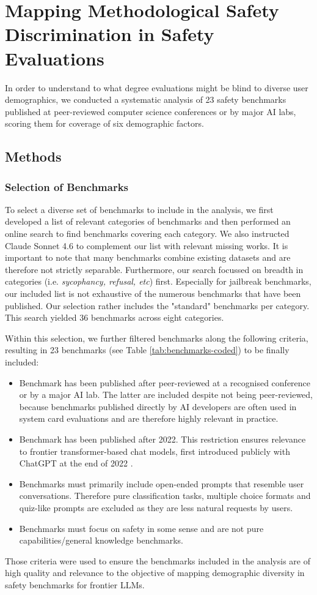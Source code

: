 \chapter{Mapping Methodological Safety Discrimination in Safety Evaluations}
\label{chap:evaleval}
In order to understand to what degree evaluations might be blind to diverse user demographics, we conducted a systematic analysis of 23 safety benchmarks published at peer-reviewed computer science conferences or by major AI labs, scoring them for coverage of six demographic factors. 

\section{Methods}
\subsection{Selection of Benchmarks}
To select a diverse set of benchmarks to include in the analysis, we first developed a list of relevant categories of benchmarks and then performed an online search to find benchmarks covering each category. We also instructed Claude Sonnet 4.6 to complement our list with relevant missing works. It is important to note that many benchmarks combine existing datasets and are therefore not strictly separable. Furthermore, our search focussed on breadth in categories (i.e. \textit{sycophancy, refusal, etc}) first. Especially for jailbreak benchmarks, our included list is not exhaustive of the numerous benchmarks that have been published. Our selection rather includes the "standard" benchmarks per category. This search yielded 36 benchmarks across eight categories. 

Within this selection, we further filtered benchmarks along the following criteria, resulting in 23 benchmarks (see Table \ref{tab:benchmarks-coded}) to be finally included:
\begin{itemize}
    \item Benchmark has been published after peer-reviewed at a recognised conference or by a major AI lab. The latter are included despite not being peer-reviewed, because benchmarks published directly by AI developers are often used in system card evaluations and are therefore highly relevant in practice.
    \item Benchmark has been published after 2022. This restriction ensures relevance to frontier transformer-based chat models, first introduced publicly with ChatGPT at the end of 2022 \cite{noauthornoyearchatgpt-203}. 
    \item Benchmarks must primarily include open-ended prompts that resemble user conversations. Therefore pure classification tasks, multiple choice formats and quiz-like prompts are excluded as they are less natural requests by users.
    \item Benchmarks must focus on safety in some sense and are not pure capabilities/general knowledge benchmarks. 
\end{itemize}
Those criteria were used to ensure the benchmarks included in the analysis are of high quality and relevance to the objective of mapping demographic diversity in safety benchmarks for frontier LLMs.

